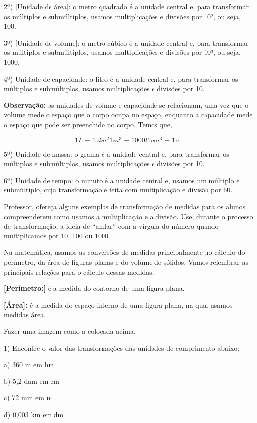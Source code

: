 2º) {[}Unidade de área{]}: o metro quadrado é a unidade central e, para
transformar os múltiplos e submúltiplos, usamos multiplicações e
divisões por 10², ou seja, 100.

3º) {[}Unidade de volume{]}: o metro cúbico é a unidade central e, para
transformar os múltiplos e submúltiplos, usamos multiplicações e
divisões por 10³, ou seja, 1000.

4º) {Unidade de capacidade:} o litro é a unidade central e, para
transformar os múltiplos e submúltiplos, usamos multiplicações e
divisões por 10.

\textbf{Observação:} as unidades de volume e capacidade se relacionam,
uma vez que o volume mede o espaço que o corpo ocupa no espaço, enquanto
a capacidade mede o espaço que pode ser preenchido no corpo. Temos que,

\[1L = 1\ dm^{2}1m^{3} = 1000l1cm^{3} = 1\text{ml}\]

5º) {Unidade de massa:} o grama é a unidade central e, para transformar
os múltiplos e submúltiplos, usamos multiplicações e divisões por 10.

6º) {Unidade de tempo:} o minuto é a unidade central e, usamos um
múltiplo e submúltiplo, cuja transformação é feita com multiplicação e
divisão por 60.

Professor, ofereça alguns exemplos de transformação de medidas para os
alunos compreenderem como usamos a multiplicação e a divisão. Use,
durante o processo de transformação, a ideia de ``andar'' com a vírgula
do número quando multiplicamos por 10, 100 ou 1000.

Na matemática, usamos as conversões de medidas principalmente no cálculo
do perímetro, da área de figuras planas e do volume de sólidos. Vamos
relembrar as principais relações para o cálculo dessas medidas.

\textbf{{[}Perímetro:{]}} é a medida do contorno de uma figura plana.

\textbf{{[}Área{]}:} é a medida do espaço interno de uma figura plana,
na qual usamos medidas área.

Fazer uma imagem como a colocada acima.


1) Encontre o valor das transformações das unidades de comprimento
abaixo:

a) 360 m em hm

b) 5,2 dam em cm

c) 72 mm em m

d) 0,003 km em dm

